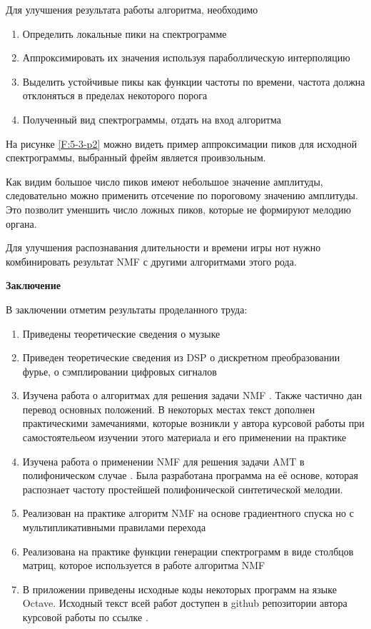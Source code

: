 \documentclass[oneside, final, 12pt]{extarticle}
\begin{document}
Для улучшения результата работы алгоритма, необходимо
\begin{enumerate}
  \item Определить локальные пики на спектрограмме
  \item Аппроксимировать их значения используя параболлическую интерполяцию
  \item Выделить устойчивые пикы как функции частоты по времени,
    частота должна отклоняться в пределах некоторого порога
  \item Полученный вид спектрограммы, отдать на вход алгоритма
\end{enumerate}

На рисунке \ref{F:5-3-p2} можно видеть пример аппроксимации пиков
для исходной спектрограммы, выбранный фрейм является проивзольным.

Как видим большое число пиков имеют небольшое значение амплитуды, следовательно
можно применить отсечение по пороговому значению амплитуды. Это позволит
уменшить число ложных пиков, которые не формируют мелодию органа.

Для улучшения распознавания длительности и времени игры нот
нужно комбинировать результат NMF с другими алгоритмами этого рода.

\cleardoublepage

{\large \bf Заключение \\}
  В заключении отметим результаты проделанного труда:
  \begin{enumerate}
    \item Приведены теоретические сведения о музыке
    \item Приведен теоретические сведения из DSP о дискретном
      преобразовании фурье, о сэмплировании цифровых сигналов
    \item Изучена работа о алгоритмах для решения задачи NMF \cite{DDL}.
      Также частично дан перевод основных положений. В некоторых
      местах текст дополнен практическими замечаниями, которые
      возникли у автора курсовой работы при самостоятельеом изучении
      этого материала и его применении на практике
    \item Изучена работа о применении NMF для решения задачи AMT
      в полифоническом случае \cite{PMTPS}. Была разработана
      программа на её основе, которая распознает частоту
      простейшей полифонической синтетической мелодии.
    \item Реализован на практике алгоритм NMF на основе градиентного
      спуска но с мультипликативными правилами перехода
    \item Реализована на практике функции генерации спектрограмм
      в виде столбцов матриц, которое используется в работе алгоритма
      NMF
    \item В приложении приведены исходные коды некоторых программ
      на языке Octave. Исходный текст всей работ доступен в github
      репозитории автора курсовой работы по ссылке \cite{L:github_nartes}.
  \end{enumerate}
\end{document}

